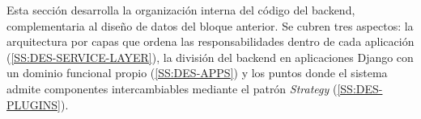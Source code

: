 Esta sección desarrolla la organización interna del código del backend,
complementaria al diseño de datos del bloque anterior. Se cubren tres
aspectos: la arquitectura por capas que ordena las responsabilidades
dentro de cada aplicación (\cref{SS:DES-SERVICE-LAYER}), la división del
backend en aplicaciones Django con un dominio funcional propio
(\cref{SS:DES-APPS}) y los puntos donde el sistema admite componentes
intercambiables mediante el patrón \textit{Strategy} (\cref{SS:DES-PLUGINS}).
